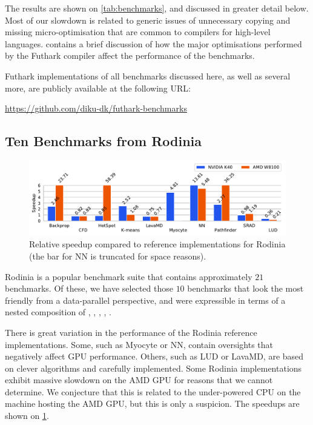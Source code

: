 The results are shown on \cref{tab:benchmarks}, and discussed in
greater detail below.  Most of our slowdown is related to generic
issues of unnecessary copying and missing micro-optimisation that are
common to compilers for high-level languages.
 contains a brief discussion of how
the major optimisations performed by the Futhark compiler affect the
performance of the benchmarks.

Futhark implementations of all benchmarks discussed here, as well as
several more, are publicly available at the following URL:

\centerline{\url{https://github.com/diku-dk/futhark-benchmarks}}

\subsection{Ten Benchmarks from Rodinia}
\label{sec:rodinia}

\begin{figure}
  \centering
  \includegraphics[scale=0.65]{experiments/rodinia.pdf}
  \caption{Relative speedup compared to reference implementations for
    Rodinia (the bar for NN is truncated for space reasons).}
  \label{fig:rodinia-speedup}
\end{figure}

Rodinia is a popular benchmark suite that contains approximately $21$
benchmarks.  Of these, we have selected those $10$ benchmarks that
look the most friendly from a data-parallel perspective, and were
expressible in terms of a nested composition of , ,
, \StreamRed{}, \StreamMap{}.

There is great variation in the performance of the Rodinia reference
implementations.  Some, such as Myocyte or NN, contain oversights that
negatively affect GPU performance.  Others, such as LUD or LavaMD, are
based on clever algorithms and carefully implemented.  Some Rodinia
implementations exhibit massive slowdown on the AMD GPU for reasons
that we cannot determine.  We conjecture that this is related to the
under-powered CPU on the machine hosting the AMD GPU, but this is only
a suspicion.  The speedups are shown on \cref{fig:rodinia-speedup}.

